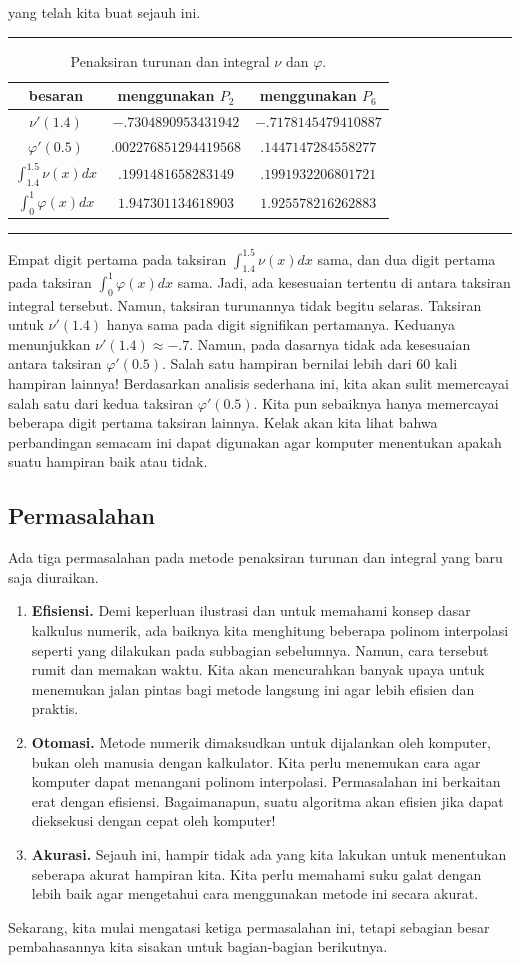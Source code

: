 yang telah kita buat sejauh ini. 
\begin{table}
\hrule \caption{\label{tab:numericalCalcFirstStab}Penaksiran turunan dan integral
$\nu$ dan $\varphi$.}

\centering{}\medskip{}
\begin{tabular}{c|cc}
besaran & menggunakan $P_{2}$ & menggunakan $P_{6}$\tabularnewline
\hline 
$\nu'(1.4)$ & $-.7304890953431942$  & $-.7178145479410887$\tabularnewline
$\varphi'(0.5)$ & $.002276851294419568$  & $.1447147284558277$\tabularnewline
$\int_{1.4}^{1.5}\nu(x)dx$ & $.1991481658283149$ & $.1991932206801721$\tabularnewline
$\int_{0}^{1}\varphi(x)dx$ & $1.947301134618903$ & $1.925578216262883$\tabularnewline
\end{tabular}\medskip{}
\hrule 
\end{table}
Empat digit pertama pada taksiran $\int_{1.4}^{1.5}\nu(x)dx$ sama,
dan dua digit pertama pada taksiran $\int_{0}^{1}\varphi(x)dx$ sama.
Jadi, ada kesesuaian tertentu di antara taksiran integral tersebut.
Namun, taksiran turunannya tidak begitu selaras. Taksiran untuk $\nu'(1.4)$
hanya sama pada digit signifikan pertamanya. Keduanya menunjukkan
$\nu'(1.4)\approx-.7$. Namun, pada dasarnya tidak ada kesesuaian
antara taksiran $\varphi'(0.5)$. Salah satu hampiran bernilai lebih
dari 60 kali hampiran lainnya! Berdasarkan analisis sederhana ini,
kita akan sulit memercayai salah satu dari kedua taksiran $\varphi'(0.5)$.
Kita pun sebaiknya hanya memercayai beberapa digit pertama taksiran
lainnya. Kelak akan kita lihat bahwa perbandingan semacam ini dapat
digunakan agar komputer menentukan apakah suatu hampiran baik atau
tidak.

\subsection{Permasalahan}

Ada tiga permasalahan pada metode penaksiran turunan dan integral
yang baru saja diuraikan.
\begin{enumerate}
\item \textbf{Efisiensi.} Demi keperluan ilustrasi dan untuk memahami konsep
dasar kalkulus numerik, ada baiknya kita menghitung beberapa polinom
interpolasi seperti yang dilakukan pada subbagian sebelumnya. Namun,
cara tersebut rumit dan memakan waktu. Kita akan mencurahkan banyak
upaya untuk menemukan jalan pintas bagi metode langsung ini agar lebih
efisien dan praktis.
\item \textbf{Otomasi.} Metode numerik dimaksudkan untuk dijalankan oleh
komputer, bukan oleh manusia dengan kalkulator. Kita perlu menemukan
cara agar komputer dapat menangani polinom interpolasi. Permasalahan
ini berkaitan erat dengan efisiensi. Bagaimanapun, suatu algoritma
akan efisien jika dapat dieksekusi dengan cepat oleh komputer!
\item \textbf{Akurasi.} Sejauh ini, hampir tidak ada yang kita lakukan untuk
menentukan seberapa akurat hampiran kita. Kita perlu memahami suku
galat dengan lebih baik agar mengetahui cara menggunakan metode ini
secara akurat.
\end{enumerate}
Sekarang, kita mulai mengatasi ketiga permasalahan ini, tetapi sebagian
besar pembahasannya kita sisakan untuk bagian-bagian berikutnya.

